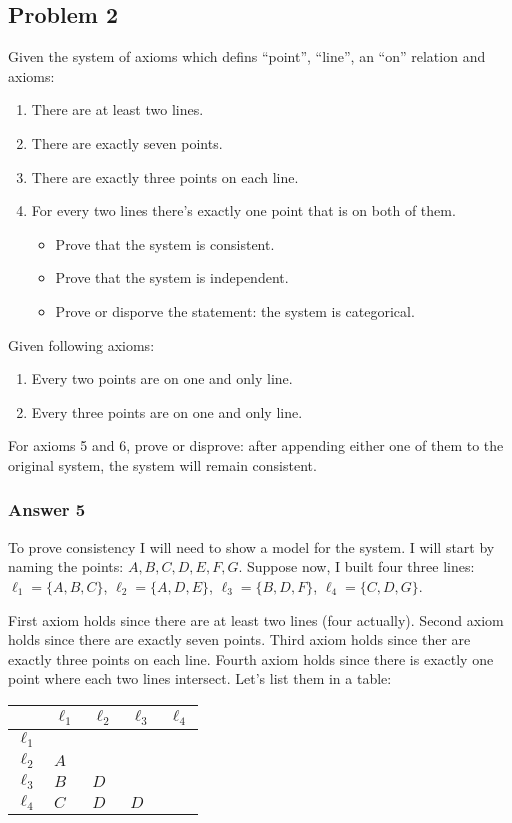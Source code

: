 \documentclass[11pt]{article}
\begin{document}
\subsection{Problem 2}
\label{sec-1-2}
Given the system of axioms which defins ``point'', ``line'', an ``on''
relation and axioms:
\begin{enumerate}
\item There are at least two lines.
\item There are exactly seven points.
\item There are exactly three points on each line.
\item For every two lines there's exactly one point that is on both of them.
\begin{itemize}
\item Prove that the system is consistent.
\item Prove that the system is independent.
\item Prove or disporve the statement: the system is categorical.
\end{itemize}
\end{enumerate}
Given following axioms:
\begin{enumerate}
\item Every two points are on one and only line.
\item Every three points are on one and only line.
\end{enumerate}

For axioms 5 and 6, prove or disprove: after appending either one of them
to the original system, the system will remain consistent.

\subsubsection{Answer 5}
\label{sec-1-2-1}
To prove consistency I will need to show a model for the system.  I will
start by naming the points: $A,B,C,D,E,F,G$.  Suppose now, I built four
three lines: $\ell_1=\{A,B,C\}$, $\ell_2=\{A,D,E\}$, $\ell_3=\{B,D,F\}$,
$\ell_4=\{C,D,G\}$.

First axiom holds since there are at least two lines (four actually).
Second axiom holds since there are exactly seven points.  Third axiom
holds since ther are exactly three points on each line.  Fourth axiom
holds since there is exactly one point where each two lines intersect.
Let's list them in a table:

\begin{center}
\begin{tabular}{l|llll}
 & $\ell_1$ & $\ell_2$ & $\ell_3$ & $\ell_4$\\
\hline
$\ell_1$ &  &  &  & \\
$\ell_2$ & $A$ &  &  & \\
$\ell_3$ & $B$ & $D$ &  & \\
$\ell_4$ & $C$ & $D$ & $D$ & \\
\end{tabular}
\end{center}
\end{document}
